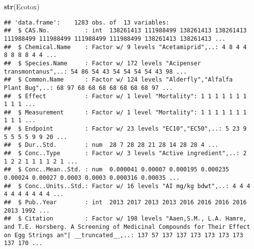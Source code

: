 \documentclass[]{article}
\newenvironment{Shaded}{\begin{snugshade}}{\end{snugshade}}
\newcommand{\KeywordTok}[1]{\textcolor[rgb]{0.13,0.29,0.53}{\textbf{#1}}}
\newcommand{\NormalTok}[1]{#1}
\begin{document}
\begin{Shaded}
\begin{Highlighting}[]
\KeywordTok{str}\NormalTok{(Ecotox)}
\end{Highlighting}
\end{Shaded}

\begin{verbatim}
## 'data.frame':    1283 obs. of  13 variables:
##  $ CAS.No.          : int  138261413 111988499 138261413 138261413 111988499 111988499 111988499 111988499 138261413 138261413 ...
##  $ Chemical.Name    : Factor w/ 9 levels "Acetamiprid",..: 4 8 4 4 8 8 8 8 4 4 ...
##  $ Species.Name     : Factor w/ 172 levels "Acipenser transmontanus",..: 54 86 54 43 54 54 54 54 43 98 ...
##  $ Common.Name      : Factor w/ 124 levels "Alderfly","Alfalfa Plant Bug",..: 68 97 68 68 68 68 68 68 68 97 ...
##  $ Effect           : Factor w/ 1 level "Mortality": 1 1 1 1 1 1 1 1 1 1 ...
##  $ Measurement      : Factor w/ 1 level "Mortality": 1 1 1 1 1 1 1 1 1 1 ...
##  $ Endpoint         : Factor w/ 23 levels "EC10","EC50",..: 5 23 9 5 5 5 5 9 9 20 ...
##  $ Dur..Std.        : num  28 7 28 28 21 28 14 28 28 4 ...
##  $ Conc..Type       : Factor w/ 3 levels "Active ingredient",..: 2 1 2 2 1 1 1 1 2 1 ...
##  $ Conc..Mean..Std. : num  0.000041 0.00007 0.000195 0.000235 0.00024 0.00027 0.0003 0.0003 0.000316 0.00035 ...
##  $ Conc..Units..Std.: Factor w/ 16 levels "AI mg/kg bdwt",..: 4 4 4 4 4 4 4 4 4 4 ...
##  $ Pub..Year        : int  2013 2017 2013 2013 2016 2016 2016 2016 2013 1992 ...
##  $ Citation         : Factor w/ 198 levels "Aaen,S.M., L.A. Hamre, and T.E. Horsberg. A Screening of Medicinal Compounds for Their Effect on Egg Strings an"| __truncated__,..: 137 57 137 137 173 173 173 173 137 170 ...
\end{verbatim}
\end{document}
